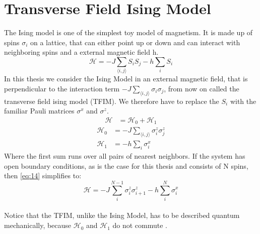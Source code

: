 \documentclass{article}
\begin{document}
\section{Transverse Field Ising Model}
The Ising model is one of the simplest toy model of magnetism. It is
made up of spins $\sigma_i$ on a lattice, that can either point up or
down and can interact with neighboring spins and a external magnetic
field h.
\begin{equation}
\label{eq:18}
\mathcal{H} = -J \sum\limits_{\langle i,j \rangle} S_i S_j- h
\sum\limits_i S_i
\end{equation}
In this thesis we consider the Ising Model in an external magnetic
field, that is perpendicular to the interaction term $-J \sum_{\langle
i,j \rangle} \sigma_i \sigma_j$, from now on called the transverse
field ising model (TFIM). We therefore have to replace the $S_i$ with
the familiar Pauli matrices $\sigma^x$ and $\sigma^z$.
\begin{align}
\label{eq:14}
\mathcal{H} &= \mathcal{H}_0 + \mathcal{H}_1
\end{align}
\begin{align}
\label{eq:24}
\mathcal{H}_0 &= -J \sum\limits_{\langle i,j \rangle} \sigma_i^z \sigma_j ^z\\
\mathcal{H}_1 &= - h \sum\limits_i \sigma_i^x
\end{align}
Where the first sum runs over all pairs of nearest neighbors. If the
system has open boundary conditions, as is the case for this thesis and consists of N spins, then
\eqref{eq:14} simplifies to:
\begin{equation}
\label{eq:19}
\mathcal{H} = -J \sum\limits_i^{N-1} \sigma_i^z \sigma_{i+1} ^z- h
\sum\limits_i^N \sigma_i^x
\end{equation}
\\
Notice that the TFIM, unlike the Ising Model, has to be described
quantum mechanically, because $\mathcal{H}_0$ and $\mathcal{H}_1$ do
not commute .
\end{document}

